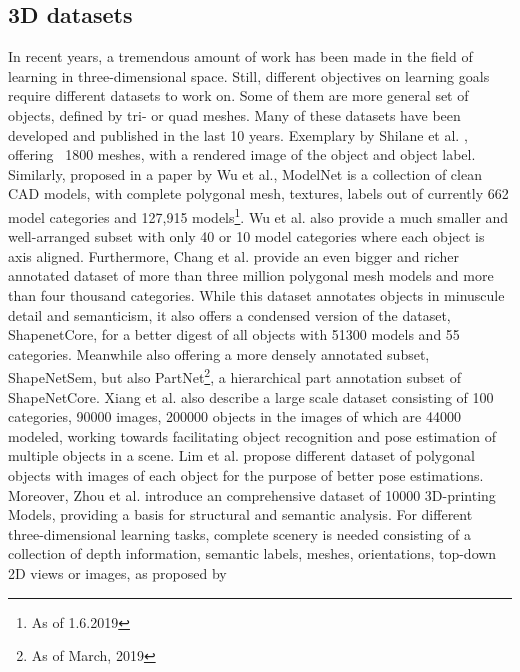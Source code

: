   \subsection{3D datasets}
  \label{3ddatasets} 
  In recent years, a tremendous amount of work has been made in the field of learning in three-dimensional space.
  Still, different objectives on learning goals require different datasets to work on. Some of them are more general 
  set of objects, defined by tri- or quad meshes. Many of these datasets have been developed and published in the last 10 years.
   Exemplary by Shilane et al. \cite{Shilane:2004:TPS}, offering ~1800 meshes, with a rendered image of the object and object label. 
   Similarly, proposed in a paper by Wu et al.\cite{7298801}, ModelNet is a collection of
    clean CAD models, with complete polygonal mesh, textures, labels out of currently 662 model categories and 127,915 models\footnote{As of 1.6.2019}.
    Wu et al. also provide a much smaller and well-arranged subset with only 40 or 10 model categories where each object is axis aligned. 
    Furthermore, Chang et al. \cite{shapenet2015} provide an even bigger and richer annotated dataset of more than three million polygonal 
    mesh models and more than four thousand categories. While this dataset annotates objects in minuscule detail and semanticism, it also 
    offers a condensed version of the dataset, ShapenetCore, for a better digest of all objects with 51300 models and 55 categories. Meanwhile also offering a more 
    densely annotated subset, ShapeNetSem, but also PartNet\footnote{As of March, 2019}, a hierarchical part annotation subset of ShapeNetCore.
    Xiang et al. \cite{xiang2016objectnet3d} also describe a large scale dataset consisting of 100 categories, 90000 images, 200000 objects in the
     images of which are  44000 modeled, working towards facilitating object recognition and pose estimation of multiple objects in a scene. 
Lim et al. \cite{lpt2013ikea} propose different dataset of polygonal objects with images of each object for the purpose of better pose estimations.
Moreover, Zhou et al. \cite{Thingi10K} introduce an comprehensive dataset of 10000 3D-printing Models, 
providing a basis for structural and semantic analysis.
For different three-dimensional learning tasks, complete scenery is needed 
consisting of a collection of depth information, semantic labels, meshes,
 orientations, top-down 2D views or images, as proposed by \cite{Silberman:ECCV12,sunrgb,objectnn-shrec17,dai2017scannet,Matterport3D,savva2017minos,wu2018building,ai2thor,qiu2017unrealcv,xiazamirhe2018gibsonenv,InteriorNet18,hackel2017isprs}
